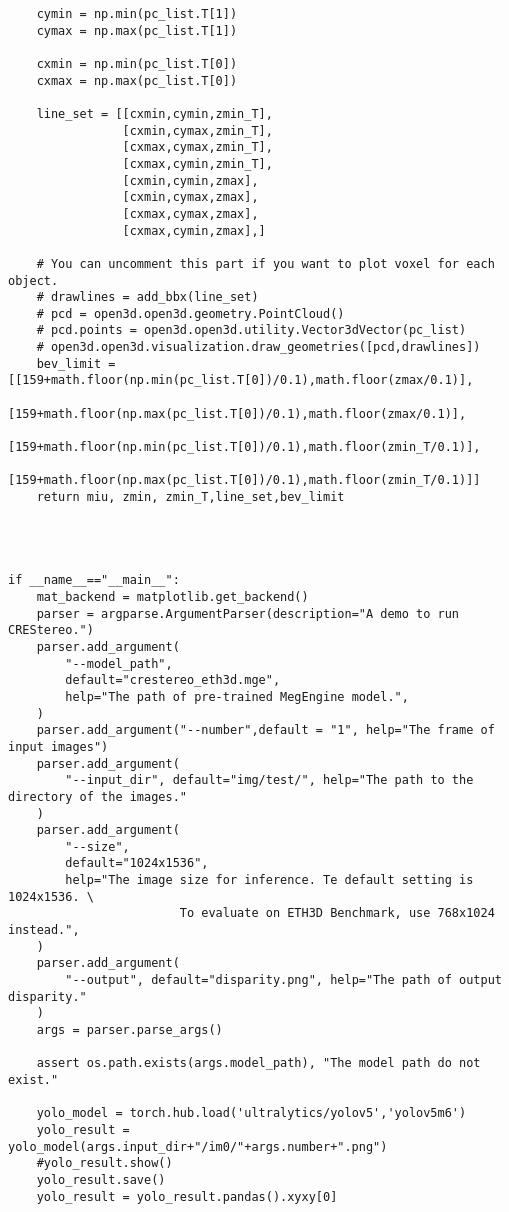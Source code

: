 \begin{verbatim}
    cymin = np.min(pc_list.T[1])
    cymax = np.max(pc_list.T[1])

    cxmin = np.min(pc_list.T[0])
    cxmax = np.max(pc_list.T[0])

    line_set = [[cxmin,cymin,zmin_T],
                [cxmin,cymax,zmin_T],
                [cxmax,cymax,zmin_T],
                [cxmax,cymin,zmin_T],
                [cxmin,cymin,zmax],
                [cxmin,cymax,zmax],
                [cxmax,cymax,zmax],
                [cxmax,cymin,zmax],]

    # You can uncomment this part if you want to plot voxel for each object.
    # drawlines = add_bbx(line_set)
    # pcd = open3d.open3d.geometry.PointCloud()
    # pcd.points = open3d.open3d.utility.Vector3dVector(pc_list)
    # open3d.open3d.visualization.draw_geometries([pcd,drawlines])
    bev_limit = [[159+math.floor(np.min(pc_list.T[0])/0.1),math.floor(zmax/0.1)],
                 [159+math.floor(np.max(pc_list.T[0])/0.1),math.floor(zmax/0.1)],
                 [159+math.floor(np.min(pc_list.T[0])/0.1),math.floor(zmin_T/0.1)],
                 [159+math.floor(np.max(pc_list.T[0])/0.1),math.floor(zmin_T/0.1)]]
    return miu, zmin, zmin_T,line_set,bev_limit




if __name__=="__main__":
    mat_backend = matplotlib.get_backend()
    parser = argparse.ArgumentParser(description="A demo to run CREStereo.")
    parser.add_argument(
        "--model_path",
        default="crestereo_eth3d.mge",
        help="The path of pre-trained MegEngine model.",
    )
    parser.add_argument("--number",default = "1", help="The frame of input images")
    parser.add_argument(
        "--input_dir", default="img/test/", help="The path to the directory of the images."
    )
    parser.add_argument(
        "--size",
        default="1024x1536",
        help="The image size for inference. Te default setting is 1024x1536. \
                        To evaluate on ETH3D Benchmark, use 768x1024 instead.",
    )
    parser.add_argument(
        "--output", default="disparity.png", help="The path of output disparity."
    )
    args = parser.parse_args()

    assert os.path.exists(args.model_path), "The model path do not exist."

    yolo_model = torch.hub.load('ultralytics/yolov5','yolov5m6')
    yolo_result = yolo_model(args.input_dir+"/im0/"+args.number+".png")
    #yolo_result.show()
    yolo_result.save()
    yolo_result = yolo_result.pandas().xyxy[0]
    

\end{verbatim}
